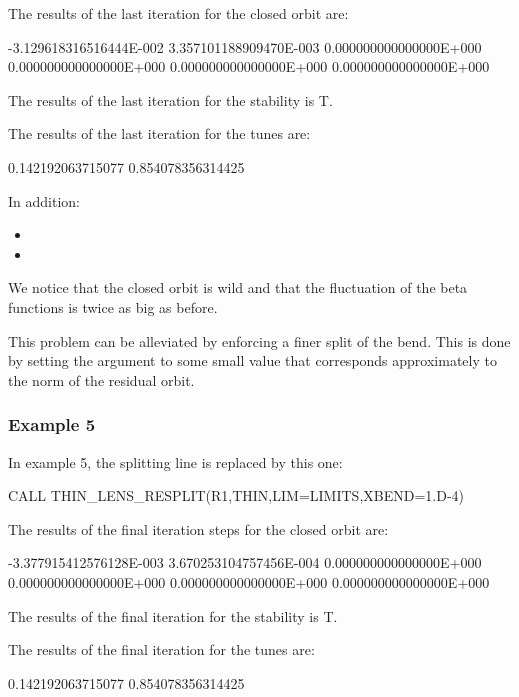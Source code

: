 The results of the last iteration for the closed orbit are:

\begin{ptccode}
 -3.129618316516444E-002  3.357101188909470E-003  0.000000000000000E+000
  0.000000000000000E+000  0.000000000000000E+000  0.000000000000000E+000
\end{ptccode}

The results of the last iteration for the stability is T.

The results of the last iteration for the tunes are:
\begin{ptccode}
0.142192063715077       0.854078356314425
\end{ptccode}

In addition:
\begin{itemize}
  \item {}
  \item {}
\end{itemize}

We notice that the closed orbit is wild and that the fluctuation of the beta functions
is twice as big as before. 

This problem can be alleviated by enforcing a finer split of the bend. This is done by
setting the   argument to some small value that corresponds approximately
to the norm of the residual orbit.


\subsubsection*{Example 5}

In example 5, the splitting line is replaced by this one:

\begin{ptccode}
CALL THIN_LENS_RESPLIT(R1,THIN,LIM=LIMITS,XBEND=1.D-4)
\end{ptccode}

The results of the final iteration steps for the closed orbit are:
\begin{ptccode}
 -3.377915412576128E-003  3.670253104757456E-004  0.000000000000000E+000
  0.000000000000000E+000  0.000000000000000E+000  0.000000000000000E+000
\end{ptccode}

The results of the final iteration for the stability is T.

The results of the final iteration for the tunes are:
\begin{ptccode}
0.142192063715077       0.854078356314425
\end{ptccode}


